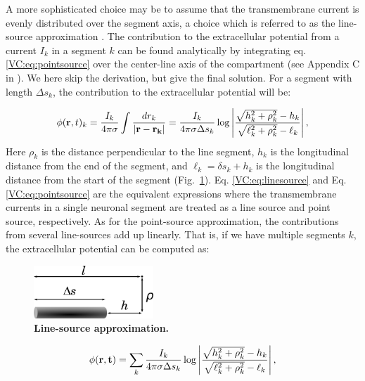 A more sophisticated choice may be to assume that the transmembrane current is evenly distributed over the segment axis, a choice which is referred to as the line-source approximation \citep{Holt1999, Linden2014}. The contribution to the extracellular potential from a current $I_k$ in a segment $k$ can be found analytically by integrating eq. \ref{VC:eq:pointsource} over the center-line axis of the compartment (see Appendix C in \citep{Holt1998}). We here skip the derivation, but give the final solution. For a segment with length $\Delta s_k$, the contribution to the extracellular potential will be:

\begin{equation}
\phi({\bf r},t)_k = \frac{I_k}{4\pi \sigma} \int \frac{dr_k}{|{\bf r-r_k}|} = 
\frac{I_k}{4\pi \sigma \Delta s_k} \log \left| \frac{\sqrt{h_k^2+\rho_k^2}-h_k}{\sqrt{\ell_k^2+\rho_k^2}-\ell_k} \right|,
\label{VC:eq:linesource}
\end{equation}
Here $\rho_k$ is the distance perpendicular to the line segment, $h_k$ is the longitudinal distance from the end of the segment, and $\ell_k = \delta s_k + h_k$ is the longitudinal distance from the start of the segment (Fig.~\ref{VC:fig:line_source_illustration}). Eq. \ref{VC:eq:linesource} and Eq. \ref{VC:eq:pointsource} are the equivalent expressions where the transmembrane currents in a single neuronal segment are treated as a line source and point source, respectively. As for the point-source approximation, the contributions from several line-sources add up linearly. That is, if we have multiple segments $k$, the extracellular potential can be computed as:
\begin{figure}[!ht]
\begin{center}
\includegraphics[width=0.4\textwidth]{Figures/VC/line_source_illustration.png}
\end{center}
\caption{\textbf{Line-source approximation.} 
\cite{Holt1998} 
}
\label{VC:fig:line_source_illustration}
\end{figure}

\begin{equation}
\phi({\bf r},{\bf t}) = \sum_k \frac{I_k}{4\pi \sigma \Delta s_k} \log \left| \frac{\sqrt{h_k^2+\rho_k^2}-h_k}{\sqrt{\ell_k^2+\rho_k^2}-\ell_k} \right|,
\label{VC:eq:linesources}
\end{equation}

